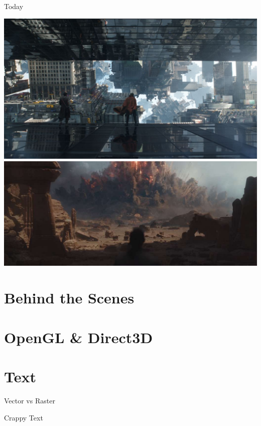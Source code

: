 \documentclass{lug}
\begin{document}
\begin{frame}{Today}
\begin{minipage}{.35\textwidth}
        \includegraphics[width=\textwidth]{graphics/dr_strange} \\
        \includegraphics[width=\textwidth]{graphics/rogue_one_boom}
    \end{minipage}
\end{frame}

\section{Behind the Scenes}

\section{OpenGL \& Direct3D}

\section{Text}

\begin{frame}{Vector vs Raster}

\end{frame}

\begin{frame}{Crappy Text}

\end{frame}
\end{document}
